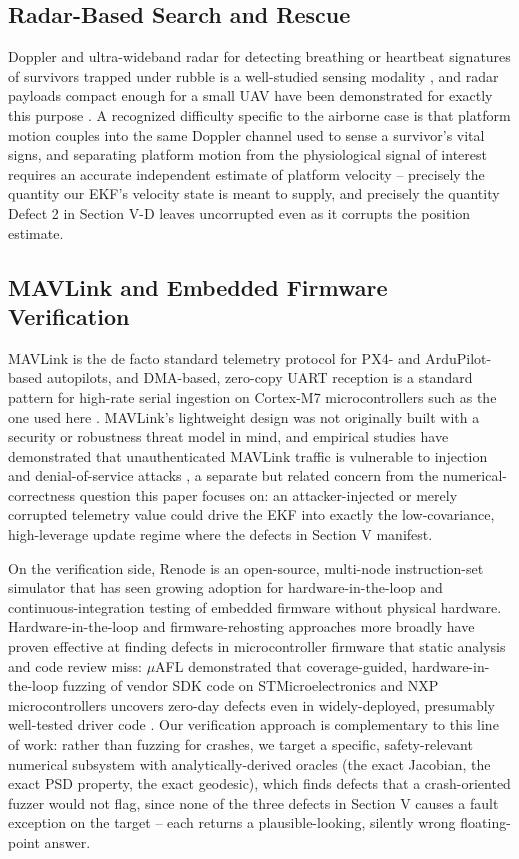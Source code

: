 \documentclass[conference]{IEEEtran}
\begin{document}
\subsection{Radar-Based Search and Rescue}

Doppler and ultra-wideband radar for detecting breathing or heartbeat signatures of survivors trapped under rubble is a well-studied sensing modality \cite{r11}, and radar payloads compact enough for a small UAV have been demonstrated for exactly this purpose \cite{r12}. A recognized difficulty specific to the airborne case is that platform motion couples into the same Doppler channel used to sense a survivor's vital signs, and separating platform motion from the physiological signal of interest requires an accurate independent estimate of platform velocity \cite{r14} -- precisely the quantity our EKF's velocity state is meant to supply, and precisely the quantity Defect 2 in Section V-D leaves uncorrupted even as it corrupts the position estimate.

\subsection{MAVLink and Embedded Firmware Verification}

MAVLink is the de facto standard telemetry protocol for PX4- \cite{r5} and ArduPilot-based autopilots, and DMA-based, zero-copy UART reception is a standard pattern for high-rate serial ingestion on Cortex-M7 microcontrollers such as the one used here \cite{r9,r10}. MAVLink's lightweight design was not originally built with a security or robustness threat model in mind, and empirical studies have demonstrated that unauthenticated MAVLink traffic is vulnerable to injection and denial-of-service attacks \cite{r18}, a separate but related concern from the numerical-correctness question this paper focuses on: an attacker-injected or merely corrupted telemetry value could drive the EKF into exactly the low-covariance, high-leverage update regime where the defects in Section V manifest.

On the verification side, Renode is an open-source, multi-node instruction-set simulator \cite{r6} that has seen growing adoption for hardware-in-the-loop and continuous-integration testing of embedded firmware without physical hardware. Hardware-in-the-loop and firmware-rehosting approaches more broadly have proven effective at finding defects in microcontroller firmware that static analysis and code review miss: $\mu$AFL demonstrated that coverage-guided, hardware-in-the-loop fuzzing of vendor SDK code on STMicroelectronics and NXP microcontrollers uncovers zero-day defects even in widely-deployed, presumably well-tested driver code \cite{r19}. Our verification approach is complementary to this line of work: rather than fuzzing for crashes, we target a specific, safety-relevant numerical subsystem with analytically-derived oracles (the exact Jacobian, the exact PSD property, the exact geodesic), which finds defects that a crash-oriented fuzzer would not flag, since none of the three defects in Section V causes a fault exception on the target -- each returns a plausible-looking, silently wrong floating-point answer.
\end{document}
